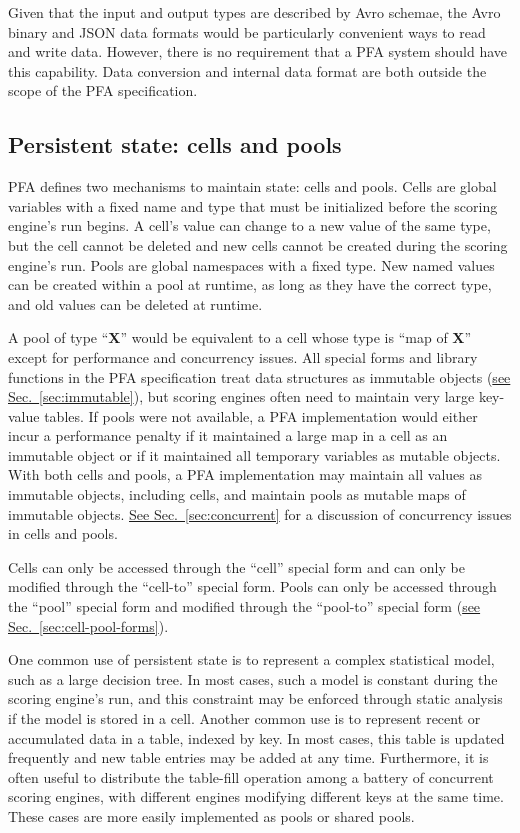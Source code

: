\documentclass{article}
\newcommand{\PFAtp}{\ttfamily\bfseries}
\theoremstyle{definition}
\begin{document}
Given that the input and output types are described by Avro schemae, the Avro binary and JSON data formats would be particularly convenient ways to read and write data.  However, there is no requirement that a PFA system should have this capability.  Data conversion and internal data format are both outside the scope of the PFA specification.

\hypertarget{hsec:state}{}
\subsection{Persistent state: cells and pools}
\label{sec:state}

PFA defines two mechanisms to maintain state: cells and pools.  Cells are global variables with a fixed name and type that must be initialized before the scoring engine's run begins.  A cell's value can change to a new value of the same type, but the cell cannot be deleted and new cells cannot be created during the scoring engine's run.  Pools are global namespaces with a fixed type.  New named values can be created within a pool at runtime, as long as they have the correct type, and old values can be deleted at runtime.

A pool of type ``{\PFAtp X}'' would be equivalent to a cell whose type is ``map of {\PFAtp X}'' except for performance and concurrency issues.  All special forms and library functions in the PFA specification treat data structures as immutable objects (\hyperlink{hsec:immutable}{see Sec.~\ref{sec:immutable}}), but scoring engines often need to maintain very large key-value tables.  If pools were not available, a PFA implementation would either incur a performance penalty if it maintained a large map in a cell as an immutable object or if it maintained all temporary variables as mutable objects.  With both cells and pools, a PFA implementation may maintain all values as immutable objects, including cells, and maintain pools as mutable maps of immutable objects.  \hyperlink{hsec:concurrent}{See Sec.~\ref{sec:concurrent}} for a discussion of concurrency issues in cells and pools.

Cells can only be accessed through the ``cell'' special form and can only be modified through the ``cell-to'' special form.  Pools can only be accessed through the ``pool'' special form and modified through the ``pool-to'' special form (\hyperlink{hsec:cell-pool-forms}{see Sec.~\ref{sec:cell-pool-forms}}).

One common use of persistent state is to represent a complex statistical model, such as a large decision tree.  In most cases, such a model is constant during the scoring engine's run, and this constraint may be enforced through static analysis if the model is stored in a cell.  Another common use is to represent recent or accumulated data in a table, indexed by key.  In most cases, this table is updated frequently and new table entries may be added at any time.  Furthermore, it is often useful to distribute the table-fill operation among a battery of concurrent scoring engines, with different engines modifying different keys at the same time.  These cases are more easily implemented as pools or shared pools.
\end{document}

